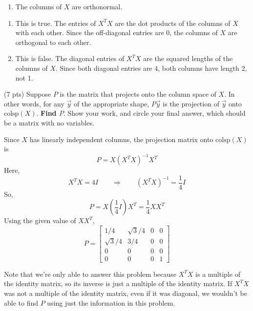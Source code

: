 \documentclass[11pt]{article}
\begin{document}
\begin{prob}[(14 pts)]
\begin{subprob}
\begin{enumerate}[label=(\roman*)]
  \item The columns of $X$ are orthonormal.

   

\end{enumerate}

\begin{solution}
\begin{enumerate}[label=(\roman*)]
  \item This is true. The entries of $X^TX$ are the dot products of the columns of $X$ with each other. Since the off-diagonal entries are 0, the columns of $X$ are orthogonal to each other.

  \item This is false. The diagonal entries of $X^TX$ are the squared lengths of the columns of $X$. Since both diagonal entries are 4, both columns have length 2, not 1.
\end{enumerate}
\end{solution}
\end{subprob}

\begin{subprob}(7 pts)
Suppose $P$ is the matrix that projects onto the column space of $X$. In other words, for any $\vec y$ of the appropriate shape, $P \vec y$ is the projection of $\vec y$ onto $\text{colsp}(X)$. \textbf{Find $P$}. Show your work, and $\boxed{\text{circle}}$ your final answer, which should be a matrix with no variables. \\

\emptybox{10cm}

\begin{solution}
Since $X$ has linearly independent columns, the projection matrix onto $\text{colsp}(X)$ is
\[
P = X(X^T X)^{-1}X^T
\]
Here,
\[
X^TX = 4I
\qquad \Longrightarrow \qquad
(X^TX)^{-1} = \frac{1}{4}I
\]
So,
\[
P = X\left(\frac{1}{4}I\right)X^T
=
\frac{1}{4}XX^T
\]
Using the given value of $XX^T$,
\[
P =
\begin{bmatrix}
1/4 & \sqrt{3}/4 & 0 & 0 \\
\sqrt{3}/4 & 3/4 & 0 & 0 \\
0 & 0 & 0 & 0 \\
0 & 0 & 0 & 1
\end{bmatrix}
\]

Note that we're only able to answer this problem because $X^TX$ is a multiple of the identity matrix, so its inverse is just a multiple of the identity matrix. If $X^TX$ was not a multiple of the identity matrix, even if it was diagonal, we wouldn't be able to find $P$ using just the information in this problem.
\end{solution}

\end{subprob}

\end{prob}
\end{document}

